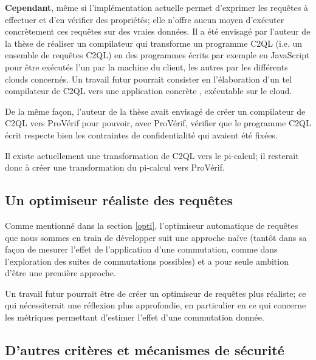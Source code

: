 \textbf{Cependant}, même si l'implémentation
actuelle permet d'exprimer les requêtes à effectuer
et d'en vérifier des propriétés; elle n'offre aucun moyen
d'exécuter concrètement ces requêtes sur des
vraies données.
Il a été envisagé par l'auteur de la thèse
de réaliser un compilateur qui transforme un programme
C2QL (i.e. un ensemble de requêtes C2QL) en
des programmes écrits par exemple en JavaScript
pour être exécutés l'un par la machine du client,
les autres par les différents clouds concernés.
Un travail futur pourrait consister en l'élaboration
d'un tel compilateur de C2QL vers une application
\og concrète \fg{}, exécutable sur le cloud.

De la même façon,
l'auteur de la thèse avait envisagé de
créer un \og compilateur \fg{} de C2QL vers
ProVérif pour pouvoir, avec ProVérif,
vérifier que le programme C2QL écrit respecte bien
les contraintes de confidentialité qui avaient été fixées.

Il existe actuellement une transformation de
C2QL vers le pi-calcul; il resterait donc
à créer une transformation du pi-calcul vers ProVérif.

\subsection*{Un optimiseur réaliste des requêtes}
Comme mentionné dans la section \ref{opti},
l'optimiseur automatique de requêtes
que nous sommes en train de développer 
suit une approche naïve (tantôt dans sa façon de
mesurer l'effet de l'application d'une commutation, 
comme dans l'exploration des suites de commutations
possibles) et a pour seule ambition d'être une
première approche.

Un travail futur pourrait être de créer un optimiseur
de requêtes plus réaliste; ce qui nécessiterait
une réflexion plus approfondie, en particulier
en ce qui concerne les métriques permettant d'estimer
l'effet d'une commutation donnée.

\subsection*{D'autres critères et mécanismes de sécurité}
